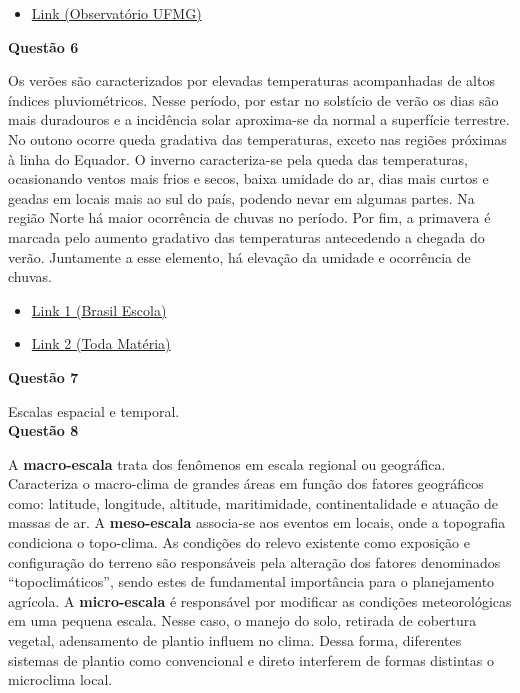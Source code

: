 \documentclass[a4paper, 12pt]{article}
\newcommand{\qs}[1]{\noindent\textbf{Questão #1}}
\begin{document}
		\begin{itemize}
			\item\href{http://www.observatorio.ufmg.br/pas44.htm}{Link (Observatório UFMG)}
		\end{itemize}
		
		\qs{6}
		
		\hspace{.2cm}Os verões são caracterizados por elevadas temperaturas acompanhadas de altos índices pluviométricos. Nesse período, por estar no solstício de verão os dias são mais duradouros e a incidência solar aproxima-se da normal a superfície terrestre. No outono ocorre queda gradativa das temperaturas, exceto nas regiões próximas à linha do Equador. O inverno caracteriza-se pela queda das temperaturas, ocasionando ventos mais frios e secos, baixa umidade do ar, dias mais curtos e geadas em locais mais ao sul do país, podendo nevar em algumas partes. Na região Norte há maior ocorrência de chuvas no período. Por fim, a primavera é marcada pelo aumento gradativo das temperaturas antecedendo a chegada do verão. Juntamente a esse elemento, há elevação da umidade e ocorrência de chuvas.
	
		\begin{itemize}
			\item\href{https://brasilescola.uol.com.br/geografia/outono.htm}{Link 1 (Brasil Escola)}
			\item\href{https://www.todamateria.com.br/verao/}{Link 2 (Toda Matéria)}
		\end{itemize}	
		\qs{7}
		
		\hspace{.2cm}Escalas espacial e temporal.\\
		
		\qs{8}
		
		\hspace{.2cm}A \textbf{macro-escala} trata dos fenômenos em escala regional ou geográfica. Caracteriza o macro-clima de grandes áreas em função dos fatores geográficos como: latitude, longitude, altitude, maritimidade, continentalidade e atuação de massas de ar. A \textbf{meso-escala} associa-se aos eventos em locais, onde a topografia condiciona o topo-clima. As condições do relevo existente como exposição e configuração do terreno são responsáveis pela alteração dos fatores denominados ``topoclimáticos'', sendo estes de fundamental importância para o planejamento agrícola. A \textbf{micro-escala} é responsável por modificar as condições meteorológicas em uma pequena escala. Nesse caso, o manejo do solo, retirada de cobertura vegetal, adensamento de plantio influem no clima. Dessa forma, diferentes sistemas de plantio como convencional e direto interferem de formas distintas o microclima local.
		
\end{document}
